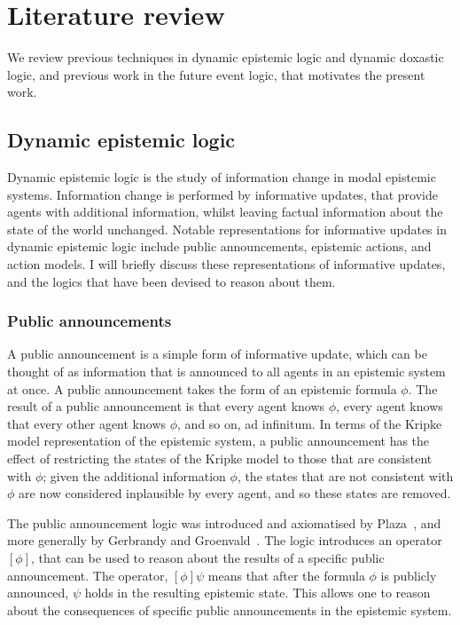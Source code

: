 \chapter{Literature review}

We review previous techniques in dynamic epistemic logic and dynamic doxastic
logic, and previous work in the future event logic, that motivates the present
work.

\section{Dynamic epistemic logic}

Dynamic epistemic logic is the study of information change in modal epistemic
systems. Information change is performed by informative updates, that provide
agents with additional information, whilst leaving factual information about the
state of the world unchanged. Notable representations for informative updates
in dynamic epistemic logic include public announcements, epistemic actions, and
action models. I will briefly discuss these representations of informative
updates, and the logics that have been devised to reason about them.

\subsection{Public announcements}

A public announcement is a simple form of informative update, which can be
thought of as information that is announced to all agents in an epistemic system
at once. A public announcement takes the form of an epistemic formula $\phi$.
The result of a public announcement is that every agent knows $\phi$, every
agent knows that every other agent knows $\phi$, and so on, ad infinitum. In
terms of the Kripke model representation of the epistemic system, a public
announcement has the effect of restricting the states of the Kripke model to
those that are consistent with $\phi$; given the additional information $\phi$,
the states that are not consistent with $\phi$ are now considered inplausible by
every agent, and so these states are removed.

The public announcement logic was introduced and axiomatised by
Plaza~\cite{plaza2007logics}, and more generally by Gerbrandy and
Groenvald~\cite{gerbrandy1997reasoning}. %
The logic introduces an operator $[\phi]$, that can be used to reason about the
results of a specific public announcement. The operator, $[\phi] \psi$ means
that after the formula $\phi$ is publicly announced, $\psi$ holds in the
resulting epistemic state. This allows one to reason about the consequences of
specific public announcements in the epistemic system.

